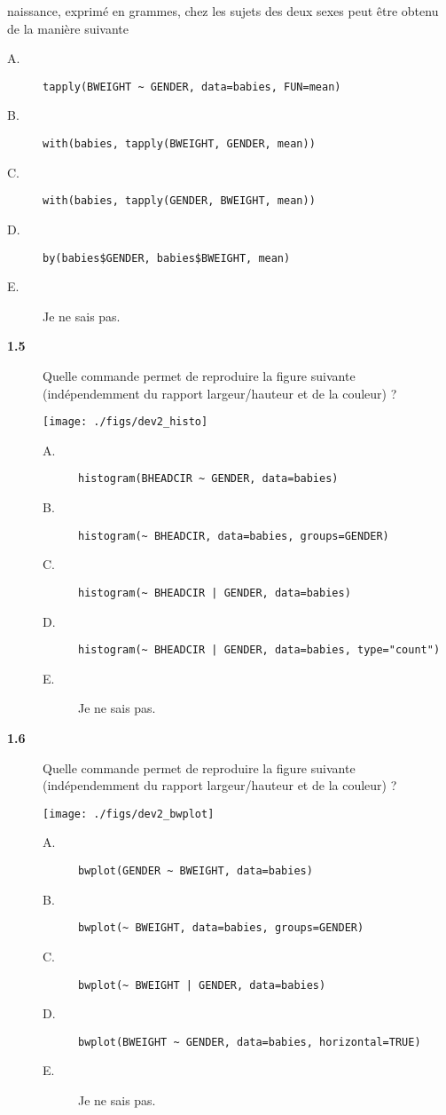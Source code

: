 \documentclass[11pt]{report}
\theoremstyle{definition}
\begin{document}
\begin{description}
  naissance, exprimé en grammes, chez les sujets des deux sexes peut être
  obtenu de la manière suivante
  \begin{description}
  \item[A.] \verb|tapply(BWEIGHT ~ GENDER, data=babies, FUN=mean)|
  \item[B.] \verb|with(babies, tapply(BWEIGHT, GENDER, mean))|
  \item[C.] \verb|with(babies, tapply(GENDER, BWEIGHT, mean))|
  \item[D.] \verb|by(babies$GENDER, babies$BWEIGHT, mean)|
  \item[E.] Je ne sais pas.
  \end{description}  
\end{description}

\begin{description}
\item[\bf 1.5]  Quelle commande permet de
  reproduire la figure suivante (indépendemment du rapport largeur/hauteur
  et de la couleur) ?
\begin{center}
  \texttt{[image: ./figs/dev2\_histo]}
\end{center}
\begin{description}
\item[A.] \verb|histogram(BHEADCIR ~ GENDER, data=babies)|
\item[B.] \verb|histogram(~ BHEADCIR, data=babies, groups=GENDER)|
\item[C.] \verb+histogram(~ BHEADCIR | GENDER, data=babies)+
\item[D.] \verb+histogram(~ BHEADCIR | GENDER, data=babies, type="count")+
\item[E.] Je ne sais pas.
\end{description}

\item[\bf 1.6]  Quelle commande permet de
  reproduire la figure suivante (indépendemment du rapport largeur/hauteur
  et de la couleur) ?
\begin{center}
  \texttt{[image: ./figs/dev2\_bwplot]}
\end{center}
\begin{description}
\item[A.] \verb|bwplot(GENDER ~ BWEIGHT, data=babies)|
\item[B.] \verb|bwplot(~ BWEIGHT, data=babies, groups=GENDER)|
\item[C.] \verb+bwplot(~ BWEIGHT | GENDER, data=babies)+
\item[D.] \verb|bwplot(BWEIGHT ~ GENDER, data=babies, horizontal=TRUE)|
\item[E.] Je ne sais pas.
\end{description}
\end{description}
\end{document}

